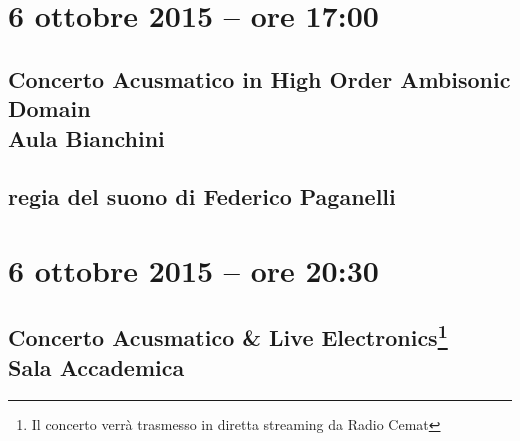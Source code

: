 \documentclass[8pt, twoside, a5paper]{extreport}
\begin{document}
\bigskip

\begin{multicols}{2}

%


\end{multicols}

\clearpage


\section*{6 ottobre 2015 -- ore 17:00}

\subsection*{{\small Concerto Acusmatico in High Order Ambisonic Domain} \\
	\textsf{Aula Bianchini}}

{\fontsize{30}{30} }

\subsection*{\textsf{regia del suono di Federico Paganelli}}

\bigskip

\begin{multicols}{2}

%


\end{multicols}

\clearpage

\section*{6 ottobre 2015 -- ore 20:30}

\subsection*{{\small Concerto Acusmatico \& Live Electronics\footnote{ Il concerto verrà trasmesso in diretta streaming da Radio Cemat}} \\
	\textsf{Sala Accademica}}

{\fontsize{30}{30} }
\end{document}
